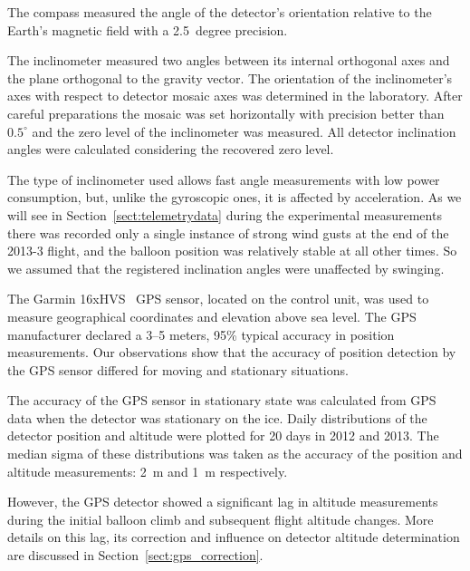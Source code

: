 \documentclass[universe,article,submit,moreauthors,pdftex]{Definitions/mdpi}
\begin{document}
The compass measured the angle of the detector's orientation relative to the Earth's magnetic field with a 2.5~degree precision.

The inclinometer measured two angles between its internal orthogonal axes and the plane orthogonal to the gravity vector. The orientation of the inclinometer's axes with respect to detector mosaic axes was determined in the laboratory. After careful preparations the mosaic was set horizontally with precision better than $0.5^\circ$ and the zero level of the inclinometer was measured. All detector inclination angles were calculated considering the recovered zero level.

The type of inclinometer used allows fast angle measurements with low power consumption, but, unlike the gyroscopic ones, it is affected by acceleration. As we will see in Section~\ref{sect:telemetrydata} during the experimental measurements there was recorded only a single instance of strong wind gusts at the end of the 2013-3 flight, and the balloon position was relatively stable at all other times. So we assumed that the registered inclination angles were unaffected by swinging.

The Garmin 16xHVS~\cite{GPS-module-specs} GPS sensor, located on the control unit, was used to measure geographical coordinates and elevation above sea level. The GPS manufacturer declared a 3–5 meters, 95\% typical accuracy in position measurements.
Our observations show that the accuracy of position detection by the GPS sensor differed for moving and stationary situations. 

The accuracy of the GPS sensor in stationary state was calculated from GPS data when the detector was stationary on the ice. Daily distributions of the detector position and altitude were plotted for 20 days in 2012 and 2013. The median sigma of these distributions was taken as the accuracy of the position and altitude measurements: 2~m and 1~m respectively.

However, the GPS detector showed a significant lag in altitude measurements during the initial balloon climb and subsequent flight altitude changes. More details on this lag, its correction and influence on detector altitude determination are discussed in Section~\ref{sect:gps_correction}.
\end{document}
